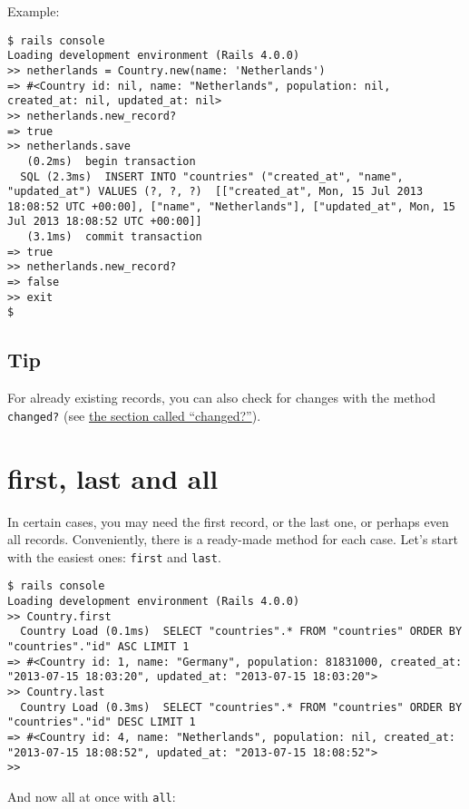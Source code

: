 \documentclass[a4paper]{book}
\newcommand{\chap}[1]{\newpage\thispagestyle{empty}\chapter{#1}\label{chap:\thechapter}}
\begin{document}
Example:

\begin{shaded}\begin{verbatim}
$ rails console
Loading development environment (Rails 4.0.0)
>> netherlands = Country.new(name: 'Netherlands')
=> #<Country id: nil, name: "Netherlands", population: nil, created_at: nil, updated_at: nil>
>> netherlands.new_record?
=> true
>> netherlands.save
   (0.2ms)  begin transaction
  SQL (2.3ms)  INSERT INTO "countries" ("created_at", "name", "updated_at") VALUES (?, ?, ?)  [["created_at", Mon, 15 Jul 2013 18:08:52 UTC +00:00], ["name", "Netherlands"], ["updated_at", Mon, 15 Jul 2013 18:08:52 UTC +00:00]]
   (3.1ms)  commit transaction
=> true
>> netherlands.new_record?
=> false
>> exit
$
\end{verbatim}\end{shaded}

\section{Tip}\label{tip-7}

For already existing records, you can also check for changes with the method \texttt{changed?} (see \hyperref[activerecordux5fchanged]{the section called “changed?”}).

\chap{first, last and all}\label{first-last-and-all}

In certain cases, you may need the first record, or the last one, or perhaps even all records. Conveniently, there is a ready-made method for each case. Let's start with the easiest ones: \texttt{first} and \texttt{last}.

\begin{shaded}\begin{verbatim}
$ rails console
Loading development environment (Rails 4.0.0)
>> Country.first
  Country Load (0.1ms)  SELECT "countries".* FROM "countries" ORDER BY "countries"."id" ASC LIMIT 1
=> #<Country id: 1, name: "Germany", population: 81831000, created_at: "2013-07-15 18:03:20", updated_at: "2013-07-15 18:03:20">
>> Country.last
  Country Load (0.3ms)  SELECT "countries".* FROM "countries" ORDER BY "countries"."id" DESC LIMIT 1
=> #<Country id: 4, name: "Netherlands", population: nil, created_at: "2013-07-15 18:08:52", updated_at: "2013-07-15 18:08:52">
>>
\end{verbatim}\end{shaded}

And now all at once with \texttt{all}:
\end{document}
